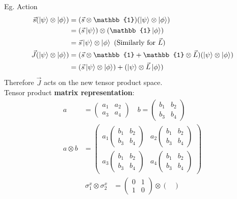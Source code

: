 \documentclass{article}
\begin{document}
\begin{flushleft}
Eg. Action
\begin{align*}
    \vec{s}(\ket{\psi}\otimes\ket{\phi})&=(\vec{s}\otimes\mathbb{1})(\ket{\psi}\otimes\ket{\phi})\\
    &=(\vec{s}\ket{\psi})\otimes(\mathbb{1}\ket{\phi})\\
    &=\vec{s}\ket{\psi}\otimes\ket{\phi}\ (\text{Similarly for}\ \vec{L})\\
    \vec{J}(\ket{\psi}\otimes\ket{\phi})&=(\vec{s}\otimes\mathbb{1}+\mathbb{1}\otimes\vec{L})(\ket{\psi}\otimes\ket{\phi})\\
    &=(\vec{s}\ket{\psi}\otimes\ket{\phi})+(\ket{\psi}\otimes\vec{L}\ket{\phi})\\
    \end{align*}
Therefore $\vec{J}$ acts on the new tensor product space.\\[.5cm]
Tensor product \textbf{matrix representation}:
\begin{align*}
a&=\begin{pmatrix}
   a_1&a_2\\
   a_3&a_4
\end{pmatrix}\quad
b=\begin{pmatrix}
    b_1&b_2\\
    b_3&b_4
\end{pmatrix}\\
a\otimes b&=\begin{pmatrix}
    a_1\begin{pmatrix}
    b_1&b_2\\
    b_3&b_4
\end{pmatrix}&a_2\begin{pmatrix}
    b_1&b_2\\
    b_3&b_4
\end{pmatrix}\\
a_3\begin{pmatrix}
    b_1&b_2\\
    b_3&b_4
\end{pmatrix}&a_4\begin{pmatrix}
    b_1&b_2\\
    b_3&b_4
\end{pmatrix}
\end{pmatrix}
\end{align*}
\begin{align*}
    \sigma^x_1\otimes\sigma^x_2&=\begin{pmatrix}
        0&1\\
        1&0
    \end{pmatrix}\otimes\begin{pmatrix}

\end{pmatrix}
\end{align*}
\end{flushleft}
\end{document}
